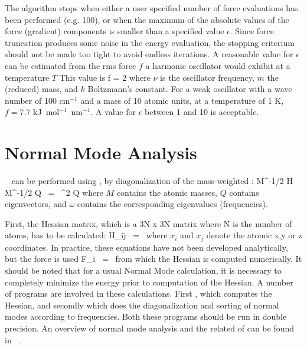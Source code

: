The algorithm stops when either a user specified number of force 
evaluations has been performed (e.g. 100), or when the maximum of the absolute
values of the force (gradient) components is smaller than a specified
value $\epsilon$.
Since force truncation produces some noise in the
energy evaluation, the stopping criterium should not be made too tight
to avoid endless iterations. A reasonable value for $\epsilon$ can be
estimated from the rms force $f$ a harmonic oscillator would exhibit at a
temperature $T$ This value is 
\beq
  f = 2 \pi \nu {}
\eeq
where $\nu$ is the oscillator frequency, $m$ the (reduced) mass, and
$k$ Boltzmann's constant. For a weak oscillator with a wave number of
100 cm$^{-1}$ and a mass of 10 atomic units, at a temperature of 1 K,
$f=7.7$ kJ~mol$^{-1}$~nm$^{-1}$. A value for $\epsilon$ between 1 and
10 is acceptable.   


\section{Normal Mode Analysis}
~\cite{Levitt83,Go83,BBrooks83b} 
can be performed using {\gromacs}, by diagonalization of the mass-weighted
:
\beq
M^{-1/2} H M^{-1/2} Q	~=~	\omega^2 Q
\eeq
where $M$ contains the atomic masses, $Q$ contains eigenvectors, and $\omega$
contains the corresponding eigenvalues (frequencies).

First, the Hessian matrix, which is a 3N x 3N matrix where N is the number
of atoms, has to be calculated:
\beq
H_{ij}	~=~	
\eeq
where $x_i$ and $x_j$ denote the atomic x,y or z coordinates.
In practice, these equations have not been developed analytically, but
the force is used
\beq
F_i	~=~	
\eeq
from which the Hessian is computed numerically. It should be noted that
for a usual Normal Mode calculation, it is necessary to completely minimize 
the energy prior to computation
of the Hessian. A number of {\gromacs} programs are involved in these
calculations. First , which computes the Hessian,
and secondly  which does the diagonalization and
sorting of normal modes according to frequencies. Both these programs
should be run in double precision. An overview of normal mode analysis
and the related  of 
 can be found in ~\cite{Hayward95b}.

